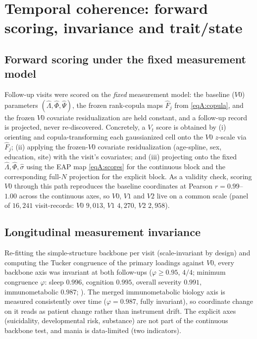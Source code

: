 \section{Temporal coherence: forward scoring, invariance and trait/state}
\label{ann:temporal}

\subsection{Forward scoring under the fixed measurement model}

Follow-up visits were scored on the \emph{fixed} measurement model: the baseline
($V0$) parameters $(\hat\Lambda,\hat\Phi,\hat\Psi)$, the frozen rank-copula maps
$\hat F_j$ from \eqref{eqA:copula}, and the frozen $V0$ covariate residualization are
held constant, and a follow-up record is projected, never re-discovered. Concretely, a
$V_t$ score is obtained by (i) orienting and copula-transforming each gaussianized cell
onto the $V0$ $z$-scale via $\hat F_j$; (ii) applying the frozen-$V0$ covariate
residualization (age-spline, sex, education, site) with the visit's covariates; and
(iii) projecting onto the fixed $\hat\Lambda,\hat\Phi,\hat\sigma$ using the EAP map
\eqref{eqA:scores} for the continuous block and the corresponding full-$N$ projection
for the explicit block. As a validity check, scoring $V0$ through this path reproduces
the baseline coordinates at Pearson $r=0.99$--$1.00$ across the continuous axes, so
$V0$, $V1$ and $V2$ live on a common scale (panel of $16{,}241$ visit-records:
$V0$ $9{,}013$, $V1$ $4{,}270$, $V2$ $2{,}958$).

\subsection{Longitudinal measurement invariance}

Re-fitting the simple-structure backbone per visit (scale-invariant by design) and
computing the Tucker congruence of the primary loadings against $V0$, every backbone
axis was invariant at both follow-ups ($\varphi\ge 0.95$, $4/4$; minimum congruence
$\varphi$: sleep $0.996$, cognition $0.995$, overall severity $0.991$,
immunometabolic $0.987$; ). The merged immunometabolic biology
axis is measured consistently over time ($\varphi=0.987$, fully invariant), so
coordinate change on it reads as patient change rather than instrument drift. The
explicit axes (suicidality, developmental risk, substance) are not part of the
continuous backbone test, and mania is data-limited (two indicators).

